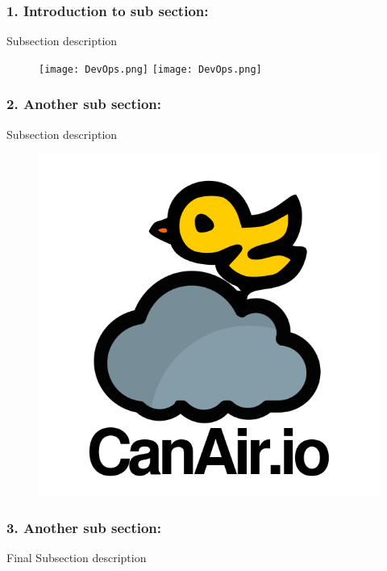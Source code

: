 \documentclass[a0paper,portrait]{baposter}
\begin{document}
\begin{poster}
{\subsubsection*{1. Introduction to sub section:}

Subsection description

\vspace{2.3cm} %


\begin{figure}
\texttt{[image: DevOps.png]} 
\texttt{[image: DevOps.png]} 
\end{figure}

\vspace{0.3cm}
\subsubsection*{2. Another sub section:}

Subsection description

\vspace{2.3cm} %

\begin{figure}
\includegraphics[width=.9\linewidth]{logo.png} 
\end{figure}

\vspace{0.35cm}
\subsubsection*{3. Another sub section:}
Final Subsection description

}
\end{poster}
\end{document}
